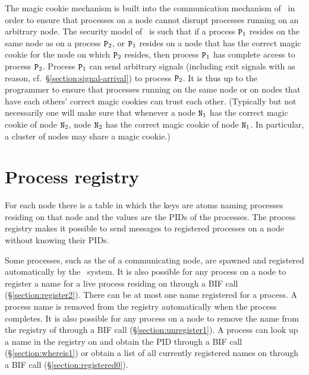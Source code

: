 The magic cookie mechanism is built into the communication mechanism
of \Erlang\ in order to ensure that processes on a node cannot
disrupt processes running on an arbitrary node.
The security model of \Erlang\ is such that if a process ${\tt{\sl P}}_1$ resides
on the same node as on a process ${\tt{\sl P}}_2$, or ${\tt{\sl P}}_1$ resides on a node
that has the correct magic cookie for the node on which ${\tt{\sl P}}_2$ resides,
then process ${\tt{\sl P}}_1$ has complete access to process ${\tt{\sl P}}_2$.  Process
${\tt{\sl P}}_1$ can send arbitrary signals (including exit signals
with  as reason, cf.\ \S\ref{section:signal-arrival})
to process ${\tt{\sl P}}_2$.  It is thus up to the programmer to ensure that
processes running on the same node or on nodes that have each others' correct
magic cookies can trust each other. (Typically but not necessarily one will
make sure that whenever
a node ${\tt{\sl N}}_1$ has the correct magic cookie of node ${\tt{\sl N}}_2$, node
${\tt{\sl N}}_2$ has the correct magic cookie of node ${\tt{\sl N}}_1$.  In particular,
a cluster of nodes may share a magic cookie.)

\section{Process registry}

\label{section:process-registry}

For each node there is a table
 in
which the keys are atoms naming processes residing on that node and the values
are the PIDs of the processes.
The process registry makes it possible to send messages to registered processes
on a node without knowing their PIDs.

Some processes, such as the 
of a communicating node, are spawned and registered automatically by the
\Erlang\ system.
It is also possible for any process on a node  to register a name 
for a live process 
residing on  through a BIF call
(\S\ref{section:register2}).
There can be at most one name registered for a process.
A process name is
removed from the registry automatically when the process completes.
It is also possible for any process on a node  to remove the name 
from the registry
of  through a BIF call
 (\S\ref{section:unregister1}).
A process  can look up a name
 in the registry on  and obtain the PID through a BIF call
(\S\ref{section:whereis1})
or obtain a list of all currently registered names on  through
a BIF call
(\S\ref{section:registered0}).

